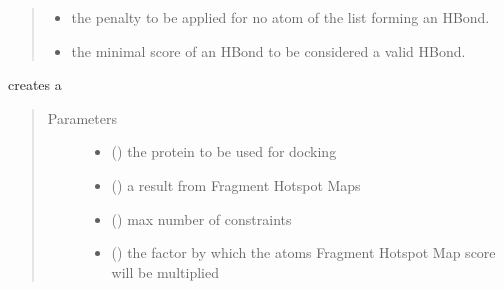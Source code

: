 \documentclass[letterpaper,10pt,english]{sphinxmanual}
\begin{document}
\begin{fulllineitems}
\begin{fulllineitems}
\begin{quote}
\begin{description}
\begin{itemize}
\item {} 
 \textendash{} the penalty to be applied for no atom of the list forming an HBond.

\item {} 
 \textendash{} the minimal score of an HBond to be considered a valid HBond.

\end{itemize}

\end{description}\end{quote}

\begin{fulllineitems}
\label{\detokenize{hs_docking_api:hotspots.hs_docking.DockerSettings.HotspotHBondConstraint.create}}
creates a 
\begin{quote}\begin{description}
\item[{Parameters}] \leavevmode\begin{itemize}
\item {} 
 () \textendash{} the protein to be used for docking

\item {} 
 () \textendash{} a result from Fragment Hotspot Maps

\item {} 
 () \textendash{} max number of constraints

\item {} 
 () \textendash{} the factor by which the atoms Fragment Hotspot Map score will be multiplied


\end{itemize}
\end{description}
\end{quote}
\end{fulllineitems}
\end{fulllineitems}
\end{fulllineitems}
\end{document}

